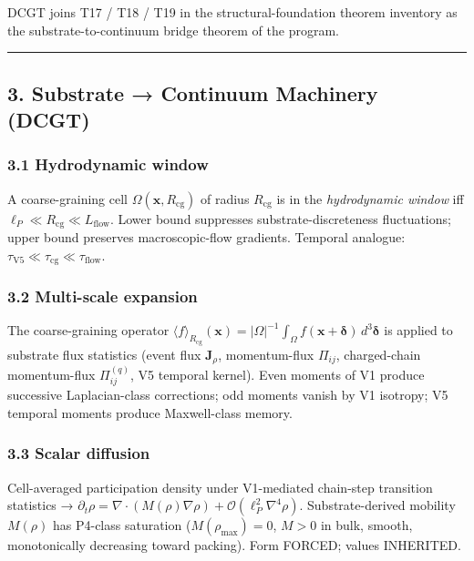 \documentclass[
  11pt,a4paper]{article}
\begin{document}
DCGT joins T17 / T18 / T19 in the structural-foundation theorem
inventory as the substrate-to-continuum bridge theorem of the program.

\begin{center}\rule{0.5\linewidth}{0.5pt}\end{center}

\subsection{3. Substrate → Continuum Machinery
(DCGT)}\label{substrate-continuum-machinery-dcgt}

\subsubsection{3.1 Hydrodynamic window}\label{hydrodynamic-window}

A coarse-graining cell \(\Omega(\mathbf{x},R_\mathrm{cg})\) of radius
\(R_\mathrm{cg}\) is in the \emph{hydrodynamic window} iff
\(\ell_P \ll R_\mathrm{cg} \ll L_\mathrm{flow}\). Lower bound suppresses
substrate-discreteness fluctuations; upper bound preserves
macroscopic-flow gradients. Temporal analogue:
\(\tau_\mathrm{V5} \ll \tau_\mathrm{cg} \ll \tau_\mathrm{flow}\).

\subsubsection{3.2 Multi-scale expansion}\label{multi-scale-expansion}

The coarse-graining operator
\(\langle f\rangle_{R_\mathrm{cg}}(\mathbf{x}) = |\Omega|^{-1}\int_\Omega f(\mathbf{x}+\boldsymbol{\delta})\,d^3\boldsymbol{\delta}\)
is applied to substrate flux statistics (event flux \(\mathbf{J}_\rho\),
momentum-flux \(\Pi_{ij}\), charged-chain momentum-flux
\(\Pi^{(q)}_{ij}\), V5 temporal kernel). Even moments of V1 produce
successive Laplacian-class corrections; odd moments vanish by V1
isotropy; V5 temporal moments produce Maxwell-class memory.

\subsubsection{3.3 Scalar diffusion}\label{scalar-diffusion}

Cell-averaged participation density under V1-mediated chain-step
transition statistics →
\(\partial_t\rho = \nabla\cdot(M(\rho)\nabla\rho) + \mathcal{O}(\ell_P^2\nabla^4\rho)\).
Substrate-derived mobility \(M(\rho)\) has P4-class saturation
(\(M(\rho_\mathrm{max}) = 0\), \(M > 0\) in bulk, smooth, monotonically
decreasing toward packing). Form FORCED; values INHERITED.
\end{document}

